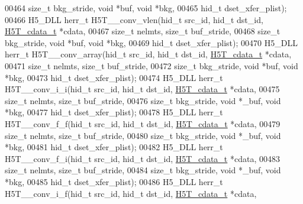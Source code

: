 \begin{DoxyCode}
00464                             \textcolor{keywordtype}{size\_t} bkg\_stride, \textcolor{keywordtype}{void} *buf, \textcolor{keywordtype}{void} *bkg,
00465                             hid\_t dset\_xfer\_plist);
00466 H5\_DLL herr\_t H5T\_\_conv\_vlen(hid\_t src\_id, hid\_t dst\_id, \hyperlink{struct_h5_t__cdata__t}{H5T\_cdata\_t} *cdata,
00467                 \textcolor{keywordtype}{size\_t} nelmts, \textcolor{keywordtype}{size\_t} buf\_stride,
00468                             \textcolor{keywordtype}{size\_t} bkg\_stride, \textcolor{keywordtype}{void} *buf, \textcolor{keywordtype}{void} *bkg,
00469                             hid\_t dset\_xfer\_plist);
00470 H5\_DLL herr\_t H5T\_\_conv\_array(hid\_t src\_id, hid\_t dst\_id, \hyperlink{struct_h5_t__cdata__t}{H5T\_cdata\_t} *cdata,
00471                 \textcolor{keywordtype}{size\_t} nelmts, \textcolor{keywordtype}{size\_t} buf\_stride,
00472                             \textcolor{keywordtype}{size\_t} bkg\_stride, \textcolor{keywordtype}{void} *buf, \textcolor{keywordtype}{void} *bkg,
00473                             hid\_t dset\_xfer\_plist);
00474 H5\_DLL herr\_t H5T\_\_conv\_i\_i(hid\_t src\_id, hid\_t dst\_id, \hyperlink{struct_h5_t__cdata__t}{H5T\_cdata\_t} *cdata,
00475                             \textcolor{keywordtype}{size\_t} nelmts, \textcolor{keywordtype}{size\_t} buf\_stride,
00476                             \textcolor{keywordtype}{size\_t} bkg\_stride, \textcolor{keywordtype}{void} *\_buf, \textcolor{keywordtype}{void} *bkg,
00477                             hid\_t dset\_xfer\_plist);
00478 H5\_DLL herr\_t H5T\_\_conv\_f\_f(hid\_t src\_id, hid\_t dst\_id, \hyperlink{struct_h5_t__cdata__t}{H5T\_cdata\_t} *cdata,
00479                 \textcolor{keywordtype}{size\_t} nelmts, \textcolor{keywordtype}{size\_t} buf\_stride,
00480                             \textcolor{keywordtype}{size\_t} bkg\_stride, \textcolor{keywordtype}{void} *\_buf, \textcolor{keywordtype}{void} *bkg,
00481                             hid\_t dset\_xfer\_plist);
00482 H5\_DLL herr\_t H5T\_\_conv\_f\_i(hid\_t src\_id, hid\_t dst\_id, \hyperlink{struct_h5_t__cdata__t}{H5T\_cdata\_t} *cdata,
00483                 \textcolor{keywordtype}{size\_t} nelmts, \textcolor{keywordtype}{size\_t} buf\_stride,
00484                             \textcolor{keywordtype}{size\_t} bkg\_stride, \textcolor{keywordtype}{void} *\_buf, \textcolor{keywordtype}{void} *bkg,
00485                             hid\_t dset\_xfer\_plist);
00486 H5\_DLL herr\_t H5T\_\_conv\_i\_f(hid\_t src\_id, hid\_t dst\_id, \hyperlink{struct_h5_t__cdata__t}{H5T\_cdata\_t} *cdata,

\end{DoxyCode}
